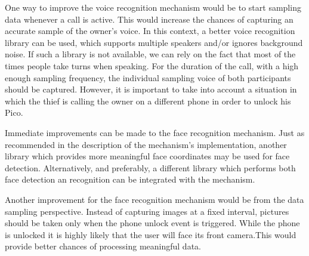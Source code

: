 One way to improve the voice recognition mechanism would be to start sampling data whenever a call is active. This would increase the chances of capturing an accurate sample of the owner's voice. In this context, a better voice recognition library can be used, which supports multiple speakers and/or ignores background noise. If such a library is not available, we can rely on the fact that most of the times people take turns when speaking. For the duration of the call, with a high enough sampling frequency, the individual sampling voice of both participants should be captured. However, it is important to take into account a situation in which the thief is calling the owner on a different phone in order to unlock his Pico.

Immediate improvements can be made to the face recognition mechanism. Just as recommended in the description of the mechanism's implementation, another library which provides more meaningful face coordinates may be used for face detection. Alternatively, and preferably, a different library which performs both face detection an recognition can be integrated with the mechanism.

Another improvement for the face recognition mechanism would be from the data sampling perspective. Instead of capturing images at a fixed interval, pictures should be taken only when the phone unlock event is triggered. While the phone is unlocked it is highly likely that the user will face its front camera.This would provide better chances of processing meaningful data.